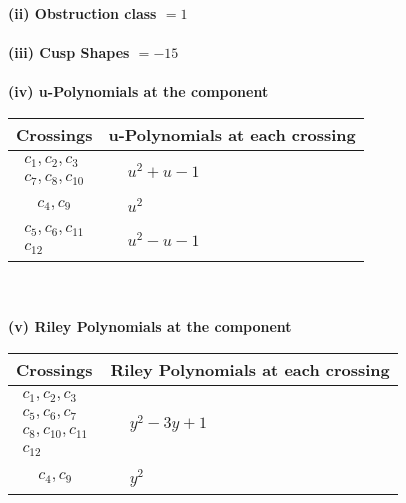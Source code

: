 \documentclass[1p]{elsarticle_modified}
\theoremstyle{definition}
\begin{document}
\flushleft \textbf{(ii) Obstruction class $= 1$}\\~\\
\flushleft \textbf{(iii) Cusp Shapes $= -15$}\\~\\
\newpage\renewcommand{\arraystretch}{1}
\flushleft \textbf{(iv) u-Polynomials at the component}\newline \\
\begin{tabular}{m{50pt}|m{274pt}}
Crossings & \hspace{64pt}u-Polynomials at each crossing \\
\hline $$\begin{aligned}c_{1},c_{2},c_{3}\\c_{7},c_{8},c_{10}\end{aligned}$$&$\begin{aligned}
&u^2+u-1
\end{aligned}$\\
\hline $$\begin{aligned}c_{4},c_{9}\end{aligned}$$&$\begin{aligned}
&u^2
\end{aligned}$\\
\hline $$\begin{aligned}c_{5},c_{6},c_{11}\\c_{12}\end{aligned}$$&$\begin{aligned}
&u^2- u-1
\end{aligned}$\\
\hline
\end{tabular}\\~\\
\newpage\renewcommand{\arraystretch}{1}
\flushleft \textbf{(v) Riley Polynomials at the component}\newline \\
\begin{tabular}{m{50pt}|m{274pt}}
Crossings & \hspace{64pt}Riley Polynomials at each crossing \\
\hline $$\begin{aligned}c_{1},c_{2},c_{3}\\c_{5},c_{6},c_{7}\\c_{8},c_{10},c_{11}\\c_{12}\end{aligned}$$&$\begin{aligned}
&y^2-3 y+1
\end{aligned}$\\
\hline $$\begin{aligned}c_{4},c_{9}\end{aligned}$$&$\begin{aligned}
&y^2
\end{aligned}$\\
\hline
\end{tabular}\\~\\
\end{document}
